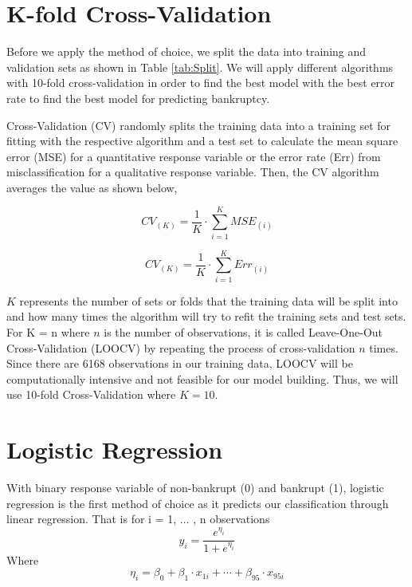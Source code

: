 \documentclass[12pt]{report}
\begin{document}
\section{K-fold Cross-Validation}
Before we apply the method of choice, we split the data into training and validation sets as shown in Table \ref{tab:Split}. We will apply different algorithms with 10-fold cross-validation in order to find the best model with the best error rate to find the best model for predicting bankruptcy.

Cross-Validation (CV) randomly splits the training data into a training set for fitting with the respective algorithm and a test set to calculate the mean square error (MSE) for a quantitative response variable or the error rate (Err) from misclassification for a qualitative response variable. Then, the CV algorithm averages the value as shown below,

\begin{equation}
    CV_{(K)} = \frac{1}{K}\cdot\sum^{K}_{i=1}MSE_{(i)}
\end{equation}

\begin{equation}
    CV_{(K)} = \frac{1}{K}\cdot\sum^{K}_{i=1}Err_{(i)}
\end{equation}

$K$ represents the number of sets or folds that the training data will be split into and how many times the algorithm will try to refit the training sets and test sets. For K = n where $n$ is the number of observations, it is called Leave-One-Out Cross-Validation (LOOCV) by repeating the process of cross-validation $n$ times. Since there are 6168 observations in our training data, LOOCV will be computationally intensive and not feasible for our model building. Thus, we will use 10-fold Cross-Validation where $K = 10$.

\section{Logistic Regression}
With binary response variable of non-bankrupt (0) and bankrupt (1), logistic regression is the first method of choice as it predicts our classification through linear regression. That is for i = 1, $\hdots$ , n observations
\begin{equation}
    y_i = \frac{e^{\eta_i}}{1+e^{\eta_i}}
\end{equation}
Where
\begin{equation}
    \eta_i = \beta_0+\beta_1\cdot x_{1i}+\cdots+\beta_{95}\cdot x_{95i}
\end{equation}
\end{document}
